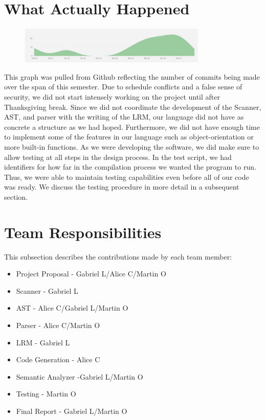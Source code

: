 \documentclass[11pt]{report}
\begin{document}
\section{What Actually Happened}
\begin{figure}[h]
	\centering
	\includegraphics[width=0.8\textwidth]{Github_Graph}
\end{figure}
This graph was pulled from Github reflecting the number of commits being made over the span of this semester. Due to schedule conflicts and a false sense of security, we did not start intensely working on the project until after Thanksgiving break. Since we did not coordinate the development of the Scanner, AST, and parser with the writing of the LRM, our language did not have as concrete a structure as we had hoped. Furthermore, we did not have enough time to implement some of the features in our language such as object-orientation or more built-in functions. As we were developing the software, we did make sure to allow testing at all steps in the design process. In the test script, we had identifiers for how far in the compilation process we wanted the program to run. Thus, we were able to maintain testing capabilities even before all of our code was ready. We discuss the testing procedure in more detail in a subsequent section. 
\section{Team Responsibilities}
This subsection describes the contributions made by each team member:
\begin{itemize}
\item Project Proposal - Gabriel L/Alice C/Martin O
\item Scanner - Gabriel L
\item AST - Alice C/Gabriel L/Martin O
\item Parser - Alice C/Martin O
\item LRM - Gabriel L
\item Code Generation - Alice C
\item Semantic Analyzer -Gabriel L/Martin O
\item Testing - Martin O 
\item Final Report - Gabriel L/Martin O
\end{itemize}
\end{document}
